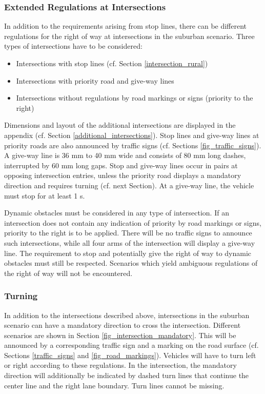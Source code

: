 \documentclass[a4paper]{report}
\begin{document}
{\subsubsection{Extended Regulations at Intersections}

In addition to the requirements arising from stop lines, there can be different regulations for the right of way at intersections in the suburban scenario. Three types of intersections have to be considered: 

\begin{itemize}
\item Intersections with stop lines (cf. Section \ref{intersection_rural}) 
\item Intersections with priority road and give-way lines 
\item Intersections without regulations by road markings or signs (priority to the right)
\end{itemize}

Dimensions and layout of the additional intersections are displayed in the appendix (cf. Section \ref{additional_intersections}). Stop lines and give-way lines at priority roads are also announced by traffic signs (cf. Sections \ref{fig_traffic_signs}). A give-way line is 36 mm to 40 mm wide and consists of 80 mm long dashes, interrupted by 60 mm long gaps. Stop and give-way lines occur in pairs at opposing intersection entries, unless the priority road displays a mandatory direction and requires turning (cf. next Section). At a give-way line, the vehicle must stop for at least 1 s. 

Dynamic obstacles must be considered in any type of intersection. If an intersection does not contain any indication of priority by road markings or signs, priority to the right is to be applied. There will be no traffic signs to announce such intersections, while all four arms of the intersection will display a give-way line. The requirement to stop and potentially give the right of way to dynamic obstacles must still be respected. Scenarios which yield ambiguous regulations of the right of way will not be encountered. 

\subsubsection{Turning}
\label{turning}

In addition to the intersections described above, intersections in the suburban scenario can have a mandatory direction to cross the intersection. Different scenarios are shown in Section \ref{fig_intersection_mandatory}. This will be announced by a corresponding traffic sign and a marking on the road surface (cf. Sections \ref{traffic_signs} and \ref{fig_road_markings}). Vehicles will have to turn left or right according to these regulations. In the intersection, the mandatory direction will additionally be indicated by dashed turn lines that continue the center line and the right lane boundary. Turn lines cannot be missing. 

}
\end{document}
